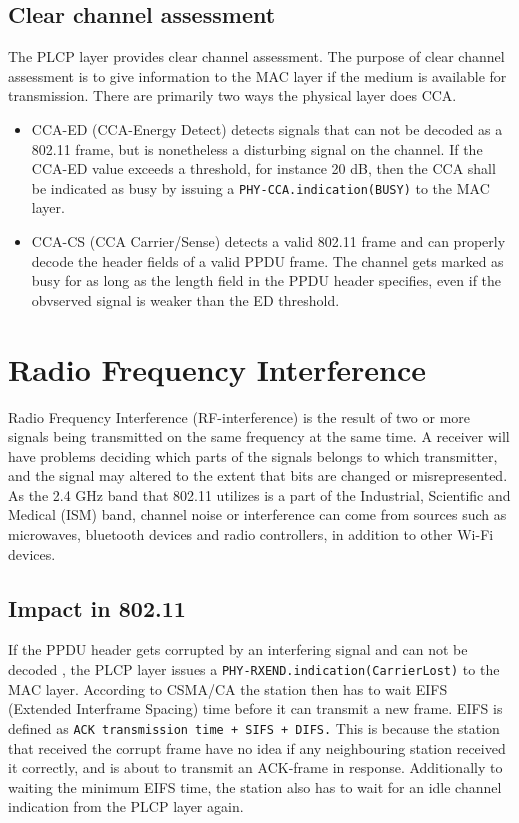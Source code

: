 	\subsection{Clear channel assessment}
	The PLCP layer provides clear channel assessment.
	The purpose of clear channel assessment is to give information to the MAC
	layer if the medium is available for transmission. There
	are primarily two ways the physical layer does CCA.
	\begin{itemize}
	\item CCA-ED (CCA-Energy Detect) detects signals that can not be decoded as a 802.11 frame, but is nonetheless a disturbing signal on the channel. If the CCA-ED value
	exceeds a threshold, for instance 20 dB, then the CCA shall be indicated as
	busy by issuing a \verb|PHY-CCA.indication(BUSY)| to the MAC layer.  
	\item CCA-CS (CCA Carrier/Sense) detects a valid 802.11 frame and can
	properly decode the header fields of a valid PPDU frame.
	The channel gets marked as busy for as long as the length
	field in the PPDU header specifies, even if the obvserved
	signal is weaker than the ED threshold. 
	\end{itemize}

	\section{Radio Frequency Interference}
	Radio Frequency Interference (RF-interference) is the result
	of two or more signals being transmitted on the same frequency at the same time.
	A receiver will have problems deciding which parts of the signals 
	belongs to which transmitter, and the signal may altered to the extent
	that bits are changed or misrepresented. As the 2.4 GHz band that 802.11
	utilizes is a part of the Industrial, Scientific and Medical (ISM) band, channel noise or interference
	can come from sources such as microwaves, bluetooth devices and radio controllers, in addition to other Wi-Fi devices. 

	\subsection{Impact in 802.11}
	If the PPDU header
	gets corrupted by an interfering signal and can not be decoded
	, the PLCP layer issues a \verb|PHY-RXEND.indication(CarrierLost)|
	to the MAC layer. According to CSMA/CA the station then has to
	wait EIFS (Extended Interframe Spacing) time before
	it can transmit a new frame. EIFS is defined as
	\verb|ACK transmission time + SIFS + DIFS.| This is because the station that received the corrupt frame have no idea if any neighbouring station
	received it correctly, and is about to transmit an ACK-frame in response. Additionally
	to waiting the minimum EIFS time, the station also has to wait for
	an idle channel indication from the PLCP layer again. 


